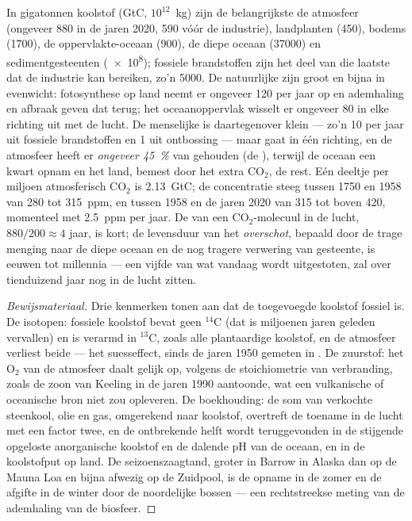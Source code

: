 \begin{proposition}\label{prop:b2:biogeochemical-cycles:carbon}
In gigatonnen koolstof (\unit{GtC}, $10^{12}$~kg) zijn de
belangrijkste  de atmosfeer (ongeveer 880 in de jaren 2020, 590
vóór de industrie), landplanten (450), bodems (1700), de oppervlakte-oceaan
(900), de diepe oceaan (\num{37000}) en sedimentgesteenten
(\num{e8}); fossiele brandstoffen zijn het deel van die laatste dat de
industrie kan bereiken, zo'n \num{5000}. De natuurlijke  zijn groot
en bijna in evenwicht: fotosynthese op land neemt er ongeveer 120 per
jaar op en ademhaling en afbraak geven dat terug; het oceaanoppervlak wisselt
er ongeveer 80 in elke richting uit met de lucht. De menselijke  is
daartegenover klein --- zo'n 10 per jaar uit fossiele brandstoffen en 1
uit ontbossing --- maar gaat in één richting, en de atmosfeer heeft er
\emph{ongeveer \qty{45}{\%}} van gehouden (de \emph{}),
terwijl de oceaan een kwart opnam en het land, bemest door het extra
$\mathrm{CO_2}$, de rest. Eén deeltje per miljoen atmosferisch $\mathrm{CO_2}$ is
\qty{2.13}{GtC}; de concentratie steeg tussen 1750 en 1958 van 280 tot
\num{315}~ppm, en tussen 1958 en de jaren 2020 van 315 tot boven \num{420},
momenteel met \qty{2.5}{ppm} per jaar. De 
van een $\mathrm{CO_2}$-molecuul in de lucht, $880/200 \approx 4$ jaar,
is kort; de levensduur van het \emph{overschot}, bepaald door de trage
menging naar de diepe oceaan en de nog tragere verwering van gesteente, is
eeuwen tot millennia --- een vijfde van wat vandaag wordt uitgestoten, zal over
tienduizend jaar nog in de lucht zitten.
\end{proposition}
\begin{proof}[Bewijsmateriaal]
Drie kenmerken tonen aan dat de toegevoegde koolstof fossiel is. De
isotopen: fossiele koolstof bevat geen $\mathrm{{}^{14}C}$ (dat is miljoenen
jaren geleden vervallen) en is verarmd in $\mathrm{{}^{13}C}$, zoals alle
plantaardige koolstof, en de atmosfeer verliest beide --- het suesseffect,
sinds de jaren 1950 gemeten in . De zuurstof: het
$\mathrm{O_2}$ van de atmosfeer daalt gelijk op, volgens de stoichiometrie van
verbranding, zoals de zoon van Keeling in de jaren 1990 aantoonde, wat een
vulkanische of oceanische bron niet zou opleveren. De boekhouding: de som van
verkochte steenkool, olie en gas, omgerekend naar koolstof, overtreft de
toename in de lucht met een factor twee, en de ontbrekende helft wordt
teruggevonden in de stijgende opgeloste anorganische koolstof en de dalende pH
van de oceaan, en in de koolstofput op land. De seizoenszaagtand, groter in
Barrow in Alaska dan op de Mauna Loa en bijna afwezig op de Zuidpool, is de
opname in de zomer en de afgifte in de winter door de noordelijke bossen ---
een rechtstreekse meting van de ademhaling van de biosfeer.
\end{proof}

